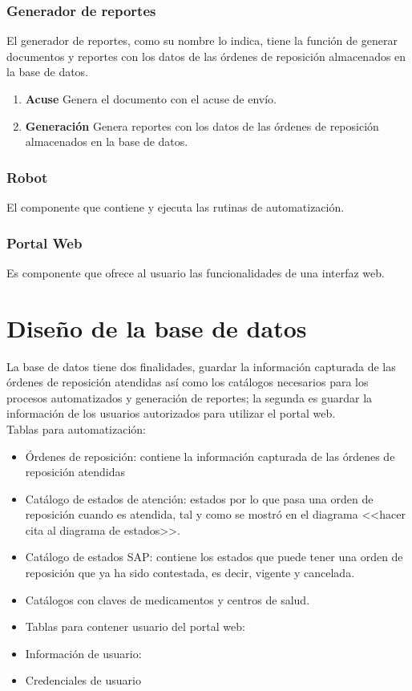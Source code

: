 \subsubsection{Generador de reportes}
El generador de reportes, como su nombre lo indica, tiene la función de generar documentos y reportes con los datos de las órdenes de reposición almacenados en la base de datos. 
\begin{enumerate}
\item \textbf{Acuse} Genera el documento con el acuse de envío.
\item \textbf{Generación} Genera reportes con los datos de las órdenes de reposición almacenados en la base de datos.
\end{enumerate}

\subsubsection{Robot}
El componente que contiene y ejecuta las rutinas de automatización. 

\subsubsection{Portal Web}
Es componente que ofrece al usuario las funcionalidades de una interfaz web. 




\section{Diseño de la base de datos}
La base de datos tiene dos finalidades, guardar la información capturada de las órdenes de reposición atendidas así como los catálogos necesarios para los procesos automatizados y generación de reportes; la segunda es guardar la información de los usuarios autorizados para utilizar el portal web.\\
Tablas para automatización:
\begin{itemize}
	\item Órdenes de reposición: contiene la información capturada de las órdenes de reposición atendidas
	\item Catálogo de estados de atención: estados por lo que pasa una orden de reposición cuando es atendida, tal y como se mostró en el diagrama <<hacer cita al diagrama de estados>>.
	\item Catálogo de estados SAP: contiene los estados que puede tener una orden de reposición que ya ha sido contestada, es decir, vigente y cancelada.
	\item Catálogos con claves de medicamentos y centros de salud.
	\item Tablas para contener usuario del portal web:
	\item Información de usuario: 
	\item Credenciales de usuario
\end{itemize}

